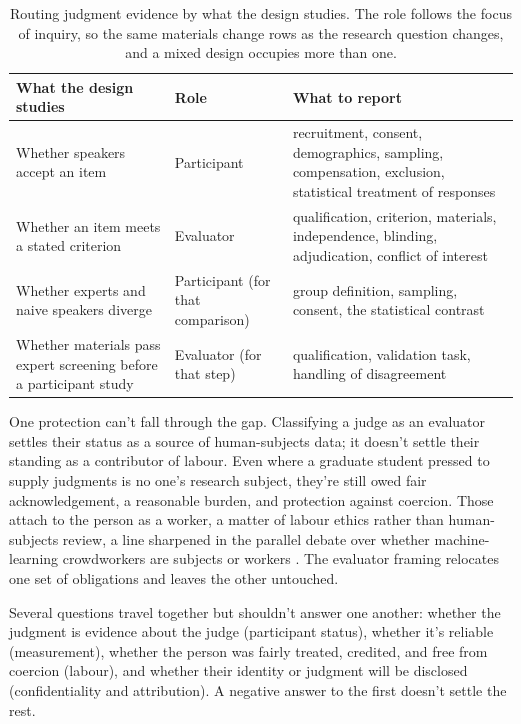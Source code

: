 \begin{table}[ht]
  \centering
  \caption{Routing judgment evidence by what the design studies. The role follows the focus of inquiry, so the same materials change rows as the research question changes, and a mixed design occupies more than one.}
  \label{tab:routing}
  \small
  \begin{tabular}{@{}p{}p{}p{}@{}}
    \toprule
    \textbf{What the design studies} & \textbf{Role} & \textbf{What to report} \\
    \midrule
    Whether speakers accept an item & Participant & recruitment, consent, demographics, sampling, compensation, exclusion, statistical treatment of responses \\
    \addlinespace
    Whether an item meets a stated criterion & Evaluator & qualification, criterion, materials, independence, blinding, adjudication, conflict of interest \\
    \addlinespace
    Whether experts and naive speakers diverge & Participant (for that comparison) & group definition, sampling, consent, the statistical contrast \\
    \addlinespace
    Whether materials pass expert screening before a participant study & Evaluator (for that step) & qualification, validation task, handling of disagreement \\
    \bottomrule
  \end{tabular}
\end{table}

One protection can't fall through the gap. Classifying a judge as an evaluator settles their status as a source of human-subjects data; it doesn't settle their standing as a contributor of labour. Even where a graduate student pressed to supply judgments is no one's research subject, they're still owed fair acknowledgement, a reasonable burden, and protection against coercion. Those attach to the person as a worker, a matter of labour ethics rather than human-subjects review, a line sharpened in the parallel debate over whether machine-learning crowdworkers are subjects or workers \citep{kaushik2023crowdworkers}. The evaluator framing relocates one set of obligations and leaves the other untouched.

Several questions travel together but shouldn't answer one another: whether the judgment is evidence about the judge (participant status), whether it's reliable (measurement), whether the person was fairly treated, credited, and free from coercion (labour), and whether their identity or judgment will be disclosed (confidentiality and attribution). A negative answer to the first doesn't settle the rest.

